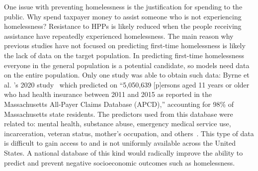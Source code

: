 \documentclass[10pt,letterpaper]{article}
\begin{document}
One issue with preventing homelessness is the justification for spending to the public. Why spend taxpayer money to assist someone who is not experiencing homelessness? Resistance to HPPs is likely reduced when the people receiving assistance have repeatedly experienced homelessness. The main reason why previous studies have not focused on predicting first-time homelessness is likely the lack of data on the target population. In predicting first-time homelessness everyone in the general population is a potential candidate, so models need data on the entire population. Only one study was able to obtain such data: Byrne et al. 's 2020 study~\cite{byrne2020classification} which predicted on ``5,050,639 [p]ersons aged 11 years or older who had health insurance between 2011 and 2015 as reported in the Massachusetts All-Payer Claims Database (APCD),'' accounting for 98\% of Massachusetts state residents. The predictors used from this database were related to: mental health, substance abuse, emergency medical service use, incarceration, veteran status, mother's occupation, and others~\cite{byrne2020classification}. This type of data is difficult to gain access to and is not uniformly available across the United States. A national database of this kind would radically improve the ability to predict and prevent negative socioeconomic outcomes such as homelessness.
\end{document}
